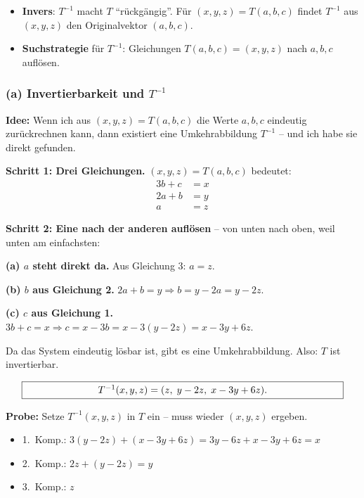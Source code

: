 \documentclass[a4paper,12pt]{article}
\begin{document}
\begin{begriffe}
\begin{itemize}[leftmargin=*, nosep]
    \item \textbf{Invers}: $T^{-1}$ macht $T$ ``r\"uckg\"angig''. F\"ur $(x, y, z) = T(a, b, c)$ findet $T^{-1}$ aus $(x, y, z)$ den Originalvektor $(a, b, c)$.
    \item \textbf{Suchstrategie} f\"ur $T^{-1}$: Gleichungen $T(a, b, c) = (x, y, z)$ nach $a, b, c$ aufl\"osen.
\end{itemize}
\end{begriffe}

\subsubsection*{(a) Invertierbarkeit und $T^{-1}$}

\textbf{Idee:} Wenn ich aus $(x, y, z) = T(a, b, c)$ die Werte $a, b, c$ eindeutig zur\"uckrechnen kann, dann existiert eine Umkehrabbildung $T^{-1}$ -- und ich habe sie direkt gefunden.

\textbf{Schritt 1: Drei Gleichungen.} $(x, y, z) = T(a, b, c)$ bedeutet:
\begin{align*}
3b + c &= x \\
2a + b &= y \\
a &= z
\end{align*}

\textbf{Schritt 2: Eine nach der anderen aufl\"osen} -- von unten nach oben, weil unten am einfachsten:

\textbf{(a) $a$ steht direkt da.} Aus Gleichung 3: $a = z$.

\textbf{(b) $b$ aus Gleichung 2.} $2a + b = y \Rightarrow b = y - 2a = y - 2z$.

\textbf{(c) $c$ aus Gleichung 1.} $3b + c = x \Rightarrow c = x - 3b = x - 3(y - 2z) = x - 3y + 6z$.

Da das System eindeutig l\"osbar ist, gibt es eine Umkehrabbildung. Also: $T$ ist invertierbar.

\[
\fbox{\parbox{0.93\textwidth}{\centering
$T^{-1}(x, y, z) = (z,\; y - 2z,\; x - 3y + 6z)$.
}}
\]

\textbf{Probe:} Setze $T^{-1}(x,y,z)$ in $T$ ein -- muss wieder $(x,y,z)$ ergeben.
\begin{itemize}[nosep, leftmargin=*]
\item 1.\ Komp.: $3(y - 2z) + (x - 3y + 6z) = 3y - 6z + x - 3y + 6z = x$ \checkmark
\item 2.\ Komp.: $2z + (y - 2z) = y$ \checkmark
\item 3.\ Komp.: $z$ \checkmark
\end{itemize}
\end{document}
